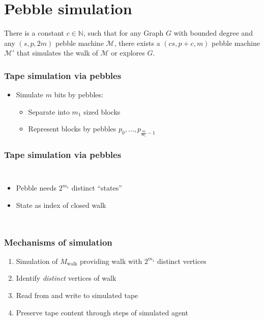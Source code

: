 \documentclass{beamer}
\begin{document}
\section{Pebble simulation}
\begin{frame}
  \begin{theorem}
    There is a constant $c\in\mathbb{N}$, such that for any Graph $G$
    with bounded degree and any $(s,p,2m)$ pebble machine $\mathcal{M}$, there
    exists a $(cs,p+c,m)$ pebble machine $\mathcal{M}'$ that simulates the walk
    of $\mathcal{M}$ or explores $G$.
  \end{theorem}
\end{frame}

\begin{frame}
  \frametitle{Tape simulation via pebbles}
  \begin{itemize}
    \item Simulate $m$ bits by pebbles:
      \begin{itemize}
        \item<3-> Separate into $m_{1}$ sized blocks
        \item<4-> Represent blocks by pebbles
          $p_{0},\dots,p_{\frac{m}{m_{1}}-1}$
      \end{itemize}
  \end{itemize}
\end{frame}

\begin{frame}
  \frametitle{Tape simulation via pebbles}
  
  \begin{columns}
    \begin{itemize}
      \item Pebble needs $2^{m_{1}}$ distinct \enquote{states}
      \item State as index of closed walk
    \end{itemize}
    \resizebox{\textwidth}{!}{}
  \end{columns}
\end{frame}

\begin{frame}
  \frametitle{Mechanisms of simulation}
  \begin{enumerate}
    \item Simulation of $M_{\text{walk}}$ providing walk with $2^{m_{1}}$
      distinct vertices
    \item Identify \emph{distinct} vertices of walk
    \item Read from and write to simulated tape
    \item Preserve tape content through steps of simulated agent
  \end{enumerate}
\end{frame}
\end{document}
